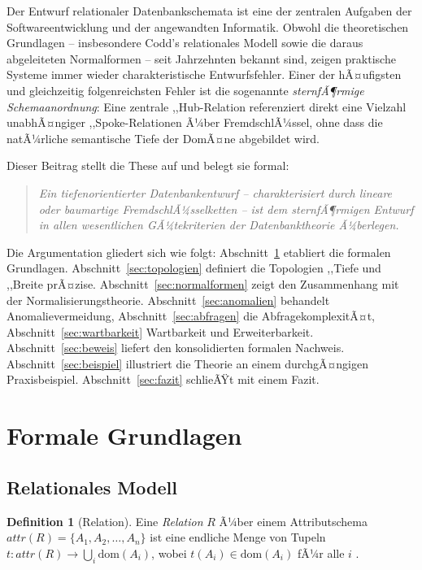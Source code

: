 ﻿\documentclass[12pt,a4paper]{article}
\theoremstyle{definition}
\newtheorem{definition}{Definition}[section]
\theoremstyle{remark}
\newcommand{\att}{\mathit{attr}}
\begin{document}
Der Entwurf relationaler Datenbankschemata ist eine der zentralen Aufgaben der
Softwareentwicklung und der angewandten Informatik. Obwohl die theoretischen
Grundlagen -- insbesondere Codd's relationales Modell \cite{Codd1970} sowie die
daraus abgeleiteten Normalformen \cite{Codd1974, Date2003} -- seit Jahrzehnten
bekannt sind, zeigen praktische Systeme immer wieder charakteristische
Entwurfsfehler. Einer der hÃ¤ufigsten und gleichzeitig folgenreichsten Fehler ist
die sogenannte \emph{sternfÃ¶rmige Schemaanordnung}: Eine zentrale
,,Hub\grqq{}-Relation referenziert direkt eine Vielzahl unabhÃ¤ngiger
,,Spoke\grqq{}-Relationen Ã¼ber FremdschlÃ¼ssel, ohne dass die natÃ¼rliche semantische
Tiefe der DomÃ¤ne abgebildet wird.

Dieser Beitrag stellt die These auf und belegt sie formal:
\begin{quote}
\emph{Ein tiefenorientierter Datenbankentwurf -- charakterisiert durch lineare
oder baumartige FremdschlÃ¼sselketten -- ist dem sternfÃ¶rmigen Entwurf in allen
wesentlichen GÃ¼tekriterien der Datenbanktheorie Ã¼berlegen.}
\end{quote}

Die Argumentation gliedert sich wie folgt: Abschnitt~\ref{sec:grundlagen}
etabliert die formalen Grundlagen. Abschnitt~\ref{sec:topologien} definiert
die Topologien ,,Tiefe\grqq{} und ,,Breite\grqq{} prÃ¤zise.
Abschnitt~\ref{sec:normalformen} zeigt den Zusammenhang mit der
Normalisierungstheorie. Abschnitt~\ref{sec:anomalien} behandelt
Anomalievermeidung, Abschnitt~\ref{sec:abfragen} die AbfragekomplexitÃ¤t,
Abschnitt~\ref{sec:wartbarkeit} Wartbarkeit und Erweiterbarkeit.
Abschnitt~\ref{sec:beweis} liefert den konsolidierten formalen Nachweis.
Abschnitt~\ref{sec:beispiel} illustriert die Theorie an einem durchgÃ¤ngigen
Praxisbeispiel. Abschnitt~\ref{sec:fazit} schlieÃŸt mit einem Fazit.

\section{Formale Grundlagen}
\label{sec:grundlagen}

\subsection{Relationales Modell}

\begin{definition}[Relation]
Eine \emph{Relation} $R$ Ã¼ber einem Attributschema $\att(R) = \{A_1, A_2, \ldots, A_n\}$
ist eine endliche Menge von Tupeln $t: \att(R) \to \bigcup_{i} \mathrm{dom}(A_i)$,
wobei $t(A_i) \in \mathrm{dom}(A_i)$ fÃ¼r alle $i$ \cite{Codd1970}.
\end{definition}
\end{document}
